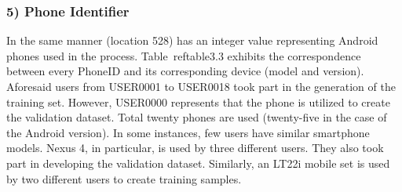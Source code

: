 \documentclass[a4paper,singleside,12pt]{report} %
\begin{document}
				\subsubsection{5) Phone Identifier}


					In the same manner (location 528) has an integer value representing Android phones used in the process. 
					Table~ref{table3.3} exhibits the correspondence between every PhoneID and its corresponding device (model and version). 
					Aforesaid users from USER0001 to USER0018 took part in the generation of the training set. 
					However, USER0000 represents that the phone is utilized to create the validation dataset. Total twenty phones are used (twenty-five in the case of the Android version). 
					In some instances, few users have similar smartphone models. Nexus 4, in particular, is used by three different users. 
					They also took part in developing the validation dataset. Similarly, an LT22i mobile set is used by two different users to create training samples. 
\end{document}
